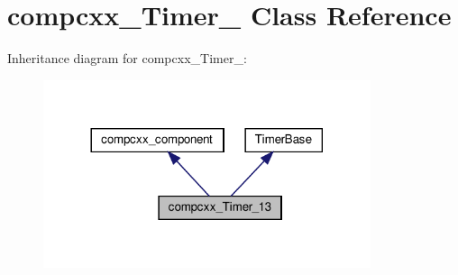 \hypertarget{classcompcxx__Timer__13}{}\section{compcxx\+\_\+\+Timer\+\_ Class Reference}
\label{classcompcxx__Timer__13}


Inheritance diagram for compcxx\+\_\+\+Timer\+\_\+:\nopagebreak
\begin{figure}[H]
\begin{center}
\leavevmode
\includegraphics[width=272pt]{classcompcxx__Timer__13__inherit__graph}
\end{center}
\end{figure}


